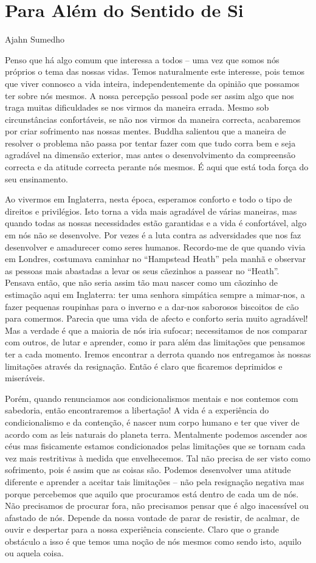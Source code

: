 \chapter{Para Além do Sentido de Si}

Ajahn Sumedho

Penso que há algo comum que interessa a todos -- uma vez que somos nós
próprios o tema das nossas vidas. Temos naturalmente este interesse,
pois temos que viver connosco a vida inteira, independentemente da
opinião que possamos ter sobre nós mesmos. A nossa percepção pessoal
pode ser assim algo que nos traga muitas dificuldades se nos virmos da
maneira errada. Mesmo sob circunstâncias confortáveis, se não nos virmos
da maneira correcta, acabaremos por criar sofrimento nas nossas mentes.
Buddha salientou que a maneira de resolver o problema não passa por
tentar fazer com que tudo corra bem e seja agradável na dimensão
exterior, mas antes o desenvolvimento da compreensão correcta e da
atitude correcta perante nós mesmos. É aqui que está toda força do seu
ensinamento.

Ao vivermos em Inglaterra, nesta época, esperamos conforto e todo o tipo
de direitos e privilégios. Isto torna a vida mais agradável de várias
maneiras, mas quando todas as nossas necessidades estão garantidas e a
vida é confortável, algo em nós não se desenvolve. Por vezes é a luta
contra as adversidades que nos faz desenvolver e amadurecer como seres
humanos. Recordo-me de que quando vivia em Londres, costumava caminhar
no ``Hampstead Heath'' pela manhã e observar as pessoas mais abastadas a
levar os seus cãezinhos a passear no ``Heath''. Pensava então, que não
seria assim tão mau nascer como um cãozinho de estimação aqui em
Inglaterra: ter uma senhora simpática sempre a mimar-nos, a fazer
pequenas roupinhas para o inverno e a dar-nos saborosos biscoitos de cão
para comermos. Parecia que uma vida de afecto e conforto seria muito
agradável! Mas a verdade é que a maioria de nós iria sufocar;
necessitamos de nos comparar com outros, de lutar e aprender, como ir
para além das limitações que pensamos ter a cada momento. Iremos
encontrar a derrota quando nos entregamos às nossas limitações através
da resignação. Então é claro que ficaremos deprimidos e miseráveis.

Porém, quando renunciamos aos condicionalismos mentais e nos contemos
com sabedoria, então encontraremos a libertação! A vida é a experiência
do condicionalismo e da contenção, é nascer num corpo humano e ter que
viver de acordo com as leis naturais do planeta terra. Mentalmente
podemos ascender aos céus mas fisicamente estamos condicionados pelas
limitações que se tornam cada vez mais restritivas à medida que
envelhecemos. Tal não precisa de ser visto como sofrimento, pois é assim
que as coisas são. Podemos desenvolver uma atitude diferente e aprender
a aceitar tais limitações -- não pela resignação negativa mas porque
percebemos que aquilo que procuramos está dentro de cada um de nós. Não
precisamos de procurar fora, não precisamos pensar que é algo
inacessível ou afastado de nós. Depende da nossa vontade de parar de
resistir, de acalmar, de ouvir e despertar para a nossa experiência
consciente. Claro que o grande obstáculo a isso é que temos uma noção de
nós mesmos como sendo isto, aquilo ou aquela coisa.

